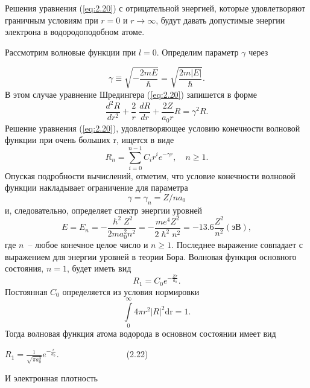 \documentclass[a4paper,14pt, openany, twoside, draft]{extbook} %
\begin{document}
Решения уравнения (\ref{eq:2.20}) с отрицательной энергией, которые удовлетворяют граничным условиям при $r=0$ и $r \rightarrow \infty$, будут давать допустимые энергии электрона в водородоподобном атоме.

Рассмотрим волновые функции при $l=0$.
Определим параметр $\gamma$ через

\begin{equation*}
 \label{eq:gamma}
\gamma\equiv\sqrt{-\frac{2mE}{\hslash}}=\sqrt{\frac{2m|E|}{\hslash}}.
\end{equation*}
В этом случае уравнение Шредингера (\ref{eq:2.20}) запишется в форме
\begin{equation}
\label{eq:shred4}
\frac{d^2R}{dr^2}+\frac{2}{r}\;\frac{dR}{dr}+\frac{2Z}{a_0r}R=\gamma^2R.
\end{equation}
Решение уравнения (\ref{eq:2.20}), удовлетворяющее условию конечности волновой функции при очень больших r, ищется в виде
\begin{equation}
\label{eq:shred5}
R_n=\overset{n-1}{\underset{i=0}{\sum }}C_ir^ie^{-\gamma r},\quad n\geq 1.
\end{equation}
Опуская подробности вычислений, отметим, что условие конечности волновой функции накладывает ограничение для параметра
\begin{equation}
\gamma=\gamma_n=Z/na_0
\end{equation}
и, следовательно, определяет спектр энергии уровней
\begin{equation}
\label{eq:2.21}
E=E_n=-\frac{\hslash^2Z^2}{2ma_0^2n^2}=-\frac{me^4Z^2}{2\hslash^2n^2}=-13.6\frac{Z^2}{n^2}(\textbf{эВ}),
\end{equation}
где $n$~-- любое конечное целое число и $n\geq1$.
Последнее выражение совпадает с выражением для энергии уровней в теории Бора.
Волновая функция основного состояния, $n=1$, будет иметь вид
\begin{equation}
\label{eq:wavefunction}
R_1=C_0e^{-\frac{Zr}{a_0}}.
\end{equation}
Постоянная $C_0$ определяется из условия нормировки
\begin{equation}
\label{eq:wavefunction}
\overset{\infty}{\underset 0{\int }}4\mathit{\pi r}^2|R|^2{\text{dr}}=1.
\end{equation}
Тогда волновая функция атома водорода в основном состоянии имеет вид

 $R_1=\frac 1{\sqrt{\mathit{\pi a}_0^3}}e^{-\frac r{a_0}}$.\ \ \ \ \ \ \ \ \ \ \ \ \ \ \ \ (2.22)

И электронная плотность
\end{document}
